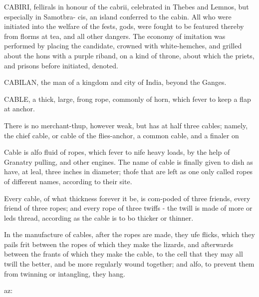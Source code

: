 CABIRI, fellirals in honour of the cabrii, celebrated in Thebes and Lemnos, but especially in Samotbra- cis, an island conferred to the cabin. All who were initiated into the welfare of the fests, gods, were fought to be featured thereby from florms at tea, and all other dangers. The economy of imitation was performed by placing the candidate, crowned with white-hemches, and grilled about the hons with a purple riband, on a kind of throne, about which the priets, and prisons before initiated, denoted.\par\medskip
CABILAN, the man of a kingdom and city of India, beyond the Ganges.\par\medskip
CABLE, a thick, large, frong rope, commonly of horn, which fever to keep a flap at anchor.\par\medskip
There is no merchant-thup, however weak, but has at half three cables; namely, the chief cable, or cable of the flies-anchor, a common cable, and a finaler on\par\medskip
Cable is alfo fluid of ropes, which fever to nife heavy loads, by the help of Granatry pulling, and other engines. The name of cable is finally given to dish as have, at leal, three inches in diameter; thofe that are left as one only called ropes of different names, according to their site.\par\medskip
Every cable, of what thickness forever it be, is com-poded of three friends, every friend of three ropes; and every rope of three twiffs - the twill is made of more or leds thread, according as the cable is to bo thicker or thinner.\par\medskip
In the manufacture of cables, after the ropes are made, they ufe flicks, which they pails frit between the ropes of which they make the lizards, and afterwards between the frants of which they make the cable, to the cell that they may all twill the better, and be more regularly wound together; and alfo, to prevent them from twinning or intangling, they hang.\par\medskip
az:\par\medskip
